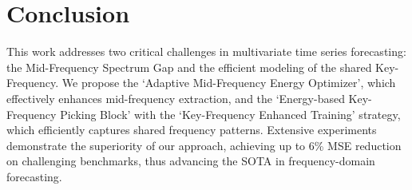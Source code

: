 \section{Conclusion}
This work addresses two critical challenges in multivariate time series forecasting: the Mid-Frequency Spectrum Gap and the efficient modeling of the shared Key-Frequency. We propose the `Adaptive Mid-Frequency Energy Optimizer', which effectively enhances mid-frequency extraction, and the `Energy-based Key-Frequency Picking Block' with the `Key-Frequency Enhanced Training' strategy, which efficiently captures shared frequency patterns. Extensive experiments demonstrate the superiority of our approach, achieving up to 6\% MSE reduction on challenging benchmarks, thus advancing the SOTA in frequency-domain forecasting.